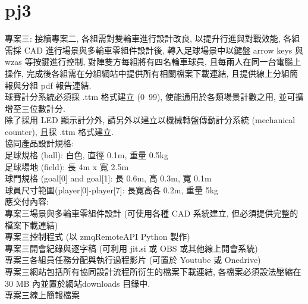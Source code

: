 ﻿\chapter{pj3}



專案三: 接續專案二, 各組需對雙輪車進行設計改良,  以提升行進與對戰效能, 各組需採 CAD 進行場景與多輪車零組件設計後, 轉入足球場景中以鍵盤 arrow keys 與 wzas 等按鍵進行控制, 對陣雙方每組將有四名輪車球員, 且每兩人在同一台電腦上操作, 完成後各組需在分組網站中提供所有相關檔案下載連結, 且提供線上分組簡報與分組 pdf 報告連結.\\

球賽計分系統必須採 .ttm 格式建立 (0~99), 使能通用於各類場景計數之用, 並可擴增至三位數計分.\\

除了採用 LED 顯示計分外, 請另外以建立以機械轉盤傳動計分系統 (mechanical counter), 且採 .ttm 格式建立.\\

協同產品設計規格:\\

足球規格 (ball): 白色, 直徑 0.1m, 重量 0.5kg\\

足球場地 (field): 長 4m x 寬 2.5m\\

球門規格 (goal[0] and goal[1]: 長 0.6m, 高 0.3m, 寬 0.1m\\

球員尺寸範圍(player[0]-player[7]: 長寬高各 0.2m, 重量 5kg\\


應交付內容:\\

專案三場景與多輪車零組件設計 (可使用各種 CAD 系統建立, 但必須提供完整的檔案下載連結)\\

專案三控制程式 (以 zmqRemoteAPI Python 製作)\\

專案三開會紀錄與逐字稿 (可利用 jit.si 或 OBS 或其他線上開會系統)\\

專案三各組員任務分配與執行過程影片 (可置於 Youtube 或 Onedrive)\\

專案三網站包括所有協同設計流程所衍生的檔案下載連結, 各檔案必須設法壓縮在 30 MB 內並置於網站downloads 目錄中.\\

專案三線上簡報檔案\\

